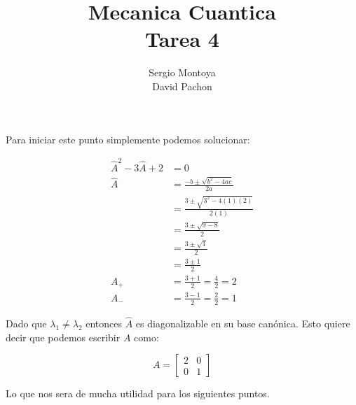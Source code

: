 \documentclass{report}
\title{\Huge{Mecanica Cuantica}\\Tarea 4}
\author{\huge{Sergio Montoya}\\\huge{David Pachon}}
\date{}
\begin{document}
\maketitle
\newpage%
\tableofcontents
\pagebreak

\chapter{}

\section{}

Para iniciar este punto simplemente podemos solucionar:

\begin{align*}
	\hat{A}^2 - 3\hat{A} + 2 &= 0 \\
	\hat{A} &= \frac{-b \pm \sqrt{b^2 - 4ac}}{2a}\\
	&= \frac{3 \pm \sqrt{3^2 - 4(1)(2)}}{2(1)} \\
	&= \frac{3 \pm \sqrt{9 - 8}}{2}\\
	&= \frac{3 \pm \sqrt{1}}{2}\\
	&= \frac{3 \pm 1}{2}\\
	A_+ &= \frac{3 + 1}{2} = \frac{4}{2} = 2\\
	A_- &= \frac{3 - 1}{2} = \frac{2}{2} = 1
\end{align*}

Dado que $\lambda_1 \neq \lambda_2$ entonces $\hat{A}$ es diagonalizable en su base canónica. Esto quiere decir que podemos escribir $A$ como:

\[
	A = 
	\begin{bmatrix}
		2 & 0 \\
		0 & 1
	\end{bmatrix}
\]

Lo que nos sera de mucha utilidad para los siguientes puntos.

\section{}
\end{document}
